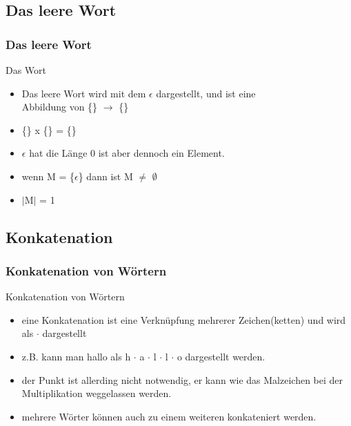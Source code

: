 \documentclass{beamer}
\begin{document}
\subsection{Das leere Wort}
\begin{frame}
	\frametitle{Das leere Wort}
	\begin{block}{Das Wort}
		\begin{itemize}
			\item Das leere Wort wird mit dem $\epsilon$ dargestellt, und ist eine \\ 
				Abbildung von \{\} $\rightarrow$ \{\} \\
			\item \{\} x \{\} = \{\} \\
			\item $\epsilon$ hat die Länge 0 ist aber dennoch ein Element. \\
			\item wenn M = \{$\epsilon$\} dann ist M $\not=$ $\emptyset$ \\
			\item $|$M$|$ = 1
		\end{itemize}
	\end{block}
\end{frame}

\subsection{Konkatenation}
\begin{frame}
	\frametitle{Konkatenation von Wörtern}
	\begin{block}{Konkatenation von Wörtern}
		\begin{itemize}
			\item eine Konkatenation ist eine Verknüpfung mehrerer Zeichen(ketten) und wird als $\cdot$ dargestellt \\
			\item z.B. kann man hallo als h $\cdot$ a $\cdot$ l $\cdot$ l $\cdot$ o dargestellt werden.\\
			\item der Punkt ist allerding nicht notwendig, er kann wie das Malzeichen bei der Multiplikation weggelassen werden. \\
			\item mehrere Wörter können auch zu einem weiteren konkateniert werden.
		\end{itemize}
	\end{block}
\end{frame}
\end{document}
